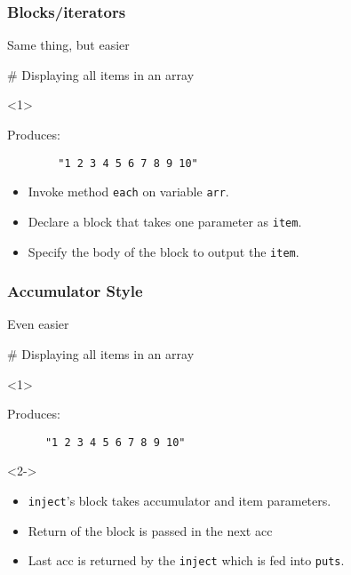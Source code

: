 \documentclass{beamer}
\begin{document}
\begin{frame}[t,fragile]
  \frametitle{Blocks/iterators}
  \begin{block}{Same thing, but easier}
    \begin{semiverbatim}
      \# Displaying all items in an array
    \end{semiverbatim}
  \end{block}
  \begin{onlyenv}<1>
    \begin{block}{Produces:}
      \begin{verbatim}
        "1 2 3 4 5 6 7 8 9 10"
      \end{verbatim}
    \end{block}
  \end{onlyenv}

  \begin{itemize}
    \item<2> Invoke method \texttt{each} on variable \texttt{arr}.
    \item<3> Declare a block that takes one parameter as \texttt{item}.
    \item<4> Specify the body of the block to output the \texttt{item}.
  \end{itemize}
\end{frame}

\begin{frame}[t,fragile]
  \frametitle{Accumulator Style}
  \begin{block}{Even easier}
    \begin{semiverbatim}
      \# Displaying all items in an array
    \end{semiverbatim}
    \begin{onlyenv}<1>
      \begin{block}{Produces:}
	\begin{verbatim}
	  "1 2 3 4 5 6 7 8 9 10"
	\end{verbatim}
      \end{block}
    \end{onlyenv}
    \begin{onlyenv}<2->
      \begin{itemize}
        \item<2> \texttt{inject}'s block takes accumulator and item parameters.
        \item<3> Return of the block is passed in the next acc
        \item<4> Last acc is returned by the \texttt{inject} which is fed into \texttt{puts}.
      \end{itemize}
    \end{onlyenv}
    \end{block}
\end{frame}
\end{document}
